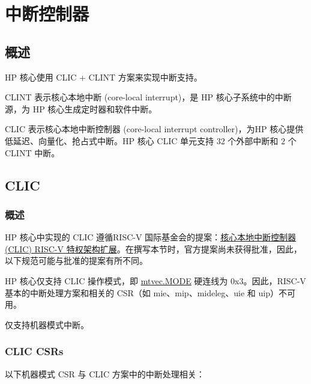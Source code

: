 \documentclass[main\_\_CN.tex]{subfiles}
\begin{document}
\newpage
\section{中断控制器}
\label{sec:riscvcpu-int-ctrl}


\subsection{概述}
\label{sec:riscvcpu-intr-overview}

HP 核心使用 CLIC + CLINT 方案来实现中断支持。

CLINT 表示核心本地中断 (core-local interrupt)，是 HP 核心子系统中的中断源，为 HP 核心生成定时器和软件中断。

CLIC 表示核心本地中断控制器 (core-local interrupt controller)，为HP 核心提供低延迟、向量化、抢占式中断。HP 核心 CLIC 单元支持 32 个外部中断和 2 个 CLINT 中断。


\subsection{CLIC}
\label{sec:riscvcpu-clic}

\subsubsection{概述}
\label{sec:riscvcpu-clic-overview}


HP 核心中实现的 CLIC 遵循RISC-V 国际基金会的提案：\hyperlink{https://github.com/riscv/riscv-fast-interrupt/blob/26d29ce6ab7f1def8e5dc0a41639a1d8f67ea339/clic.adoc}{核心本地中断控制器 (CLIC) RISC-V 特权架构扩展}。在撰写本节时，官方提案尚未获得批准，因此，以下规范可能与批准的提案有所不同。

HP 核心仅支持 CLIC 操作模式，即 \hyperref[fielddesc:MTVECMODE]{mtvec.MODE} 硬连线为 0x3。因此，RISC-V 基本的中断处理方案和相关的 CSR（如 mie、mip、mideleg、uie 和 uip）不可用。

仅支持机器模式中断。

\subsubsection{CLIC CSRs}
\label{sec:riscvcpu-clic-csrs}

以下机器模式 CSR 与 CLIC 方案中的中断处理相关：
\end{document}

